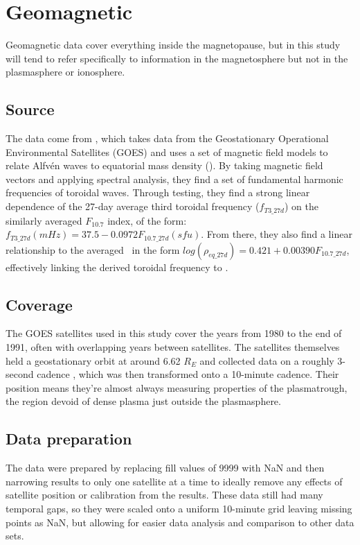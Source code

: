 \section{Geomagnetic}
Geomagnetic data cover everything inside the magnetopause, but in this study will tend to refer specifically to information in the magnetosphere but not in the plasmasphere or ionosphere.

\subsection{Source}
The data come from \cite{Takahashi2010SolarCycleVariation}, which takes data from the Geostationary Operational Environmental Satellites (GOES) and uses a set of magnetic field models to relate Alfvén waves to equatorial mass density (\req). By taking magnetic field vectors and applying spectral analysis, they find a set of fundamental harmonic frequencies of toroidal waves. Through testing, they find a strong linear dependence of the 27-day average third toroidal frequency ($f_{T3\_27d}$) on the similarly averaged $F_{10.7}$ index, of the form: $f_{T3\_27d}(mHz)=37.5-0.0972 F_{10.7\_27d}(sfu)$. From there, they also find a linear relationship to the averaged \req\ in the form $log(\rho_{eq\_27d})=0.421+0.00390 F_{10.7\_27d}$, effectively linking the derived toroidal frequency to \req.

\subsection{Coverage}
The GOES satellites used in this study cover the years from 1980 to the end of 1991, often with overlapping years between satellites. The satellites themselves held a geostationary orbit at around 6.62 $R_E$ and collected data on a roughly 3-second cadence \citep{GOESDataSource}, which was then transformed onto a 10-minute cadence. Their position means they're almost always measuring properties of the plasmatrough, the region devoid of dense plasma just outside the plasmasphere.

\subsection{Data preparation}
The data were prepared by replacing fill values of 9999 with NaN and then narrowing results to only one satellite at a time to ideally remove any effects of satellite position or calibration from the results. These data still had many temporal gaps, so they were scaled onto a uniform 10-minute grid leaving missing points as NaN, but allowing for easier data analysis and comparison to other data sets.


